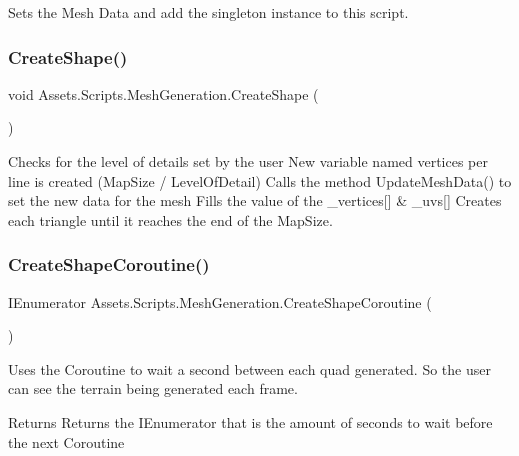 Sets the Mesh Data and add the singleton instance to this script. 

\mbox{\label{class_assets_1_1_scripts_1_1_mesh_generation_aebf4b5f0cb1285927d7c44a03e98d78c}} 
\subsubsection{\texorpdfstring{CreateShape()}{CreateShape()}}
{\footnotesize\ttfamily void Assets.\+Scripts.\+Mesh\+Generation.\+Create\+Shape (\begin{DoxyParamCaption}{ }\end{DoxyParamCaption})}



Checks for the level of details set by the user New variable named vertices per line is created (Map\+Size / Level\+Of\+Detail) Calls the method Update\+Mesh\+Data() to set the new data for the mesh Fills the value of the \+\_\+vertices\mbox{[}\mbox{]} \& \+\_\+uvs\mbox{[}\mbox{]} Creates each triangle until it reaches the end of the Map\+Size. 

\mbox{\label{class_assets_1_1_scripts_1_1_mesh_generation_a533ee7b8be835fa3b6f6282e86fd9ec6}} 
\subsubsection{\texorpdfstring{CreateShapeCoroutine()}{CreateShapeCoroutine()}}
{\footnotesize\ttfamily I\+Enumerator Assets.\+Scripts.\+Mesh\+Generation.\+Create\+Shape\+Coroutine (\begin{DoxyParamCaption}{ }\end{DoxyParamCaption})}



Uses the Coroutine to wait a second between each quad generated. So the user can see the terrain being generated each frame. 

\begin{DoxyReturn}{Returns}
Returns the I\+Enumerator that is the amount of seconds to wait before the next Coroutine
\end{DoxyReturn}
\mbox{\label{class_assets_1_1_scripts_1_1_mesh_generation_a132027f38358668e6f8c320b00ee9327}} 
